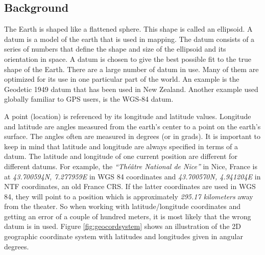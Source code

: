 \subsection{Background}
The Earth is shaped like a flattened sphere. This shape is called an ellipsoid. A datum is a model of the earth that is used in mapping. The datum consists of a series of numbers that define the shape and size of the ellipsoid and its orientation in space. A datum is chosen to give the best possible fit to the true shape of the Earth.
There are a large number of datum in use. Many of them are optimized for its use in one particular part of the world. An example is the Geodetic 1949 datum that has been used in New Zealand. Another example used globally familiar to GPS users, is the WGS-84 datum.

\begin{figure}[h!tb]

\end{figure}
A point (location) is referenced by its longitude and latitude values. Longitude and latitude are angles measured from the earth's center to a point on the earth's surface. The angles often are measured in degrees (or in grads). It is important to keep in mind that latitude and longitude are always specified in terms of a datum. The latitude and longitude of one current position are different for different datums. For example, the \emph{``Th\'{e}\^{a}tre National de Nice''} in Nice, France is at \emph{43.700594\degree N, 7.277959\degree E} in WGS 84 coordinates and \emph{43.700570\degree N, 4.941204\degree E} in NTF coordinates, an old France CRS. If the latter coordinates are used in WGS 84, they will point to a position which is approximately \textit{295.17 kilometers} away from the theater. So when working with latitude/longitude coordinates and getting an error of a couple of hundred meters, it is most likely that the wrong datum is in used. Figure \ref{fig:geocordsystem} shows an illustration of the 2D geographic coordinate system \cite{knippers09} with latitudes and longitudes given in angular degrees.
